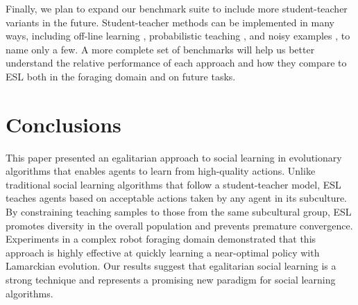 \documentclass{sig-alternate}
\begin{document}
Finally, we plan to expand our benchmark suite to include more student-teacher variants in the future. Student-teacher methods can be implemented in many ways, including off-line learning \cite{acerbi2007social}, probabilistic teaching \cite{haasdijk2008social}, and noisy examples \cite{denaro1996cultural}, to name only a few. A more complete set of benchmarks will help us better understand the relative performance of each approach and how they compare to ESL both in the foraging domain and on future tasks.


\section{Conclusions}
\label{sec:conclusions}

This paper presented an egalitarian approach to social learning in evolutionary algorithms that enables agents to learn from high-quality actions. Unlike traditional social learning algorithms that follow a student-teacher model, ESL teaches agents based on acceptable actions taken by any agent in its subculture. By constraining teaching samples to those from the same subcultural group, ESL promotes diversity in the overall population and prevents premature convergence. Experiments in a complex robot foraging domain demonstrated that this approach is highly effective at quickly learning a near-optimal policy with Lamarckian evolution. Our results suggest that egalitarian social learning is a strong technique and represents a promising new paradigm for social learning algorithms.



\end{document}
